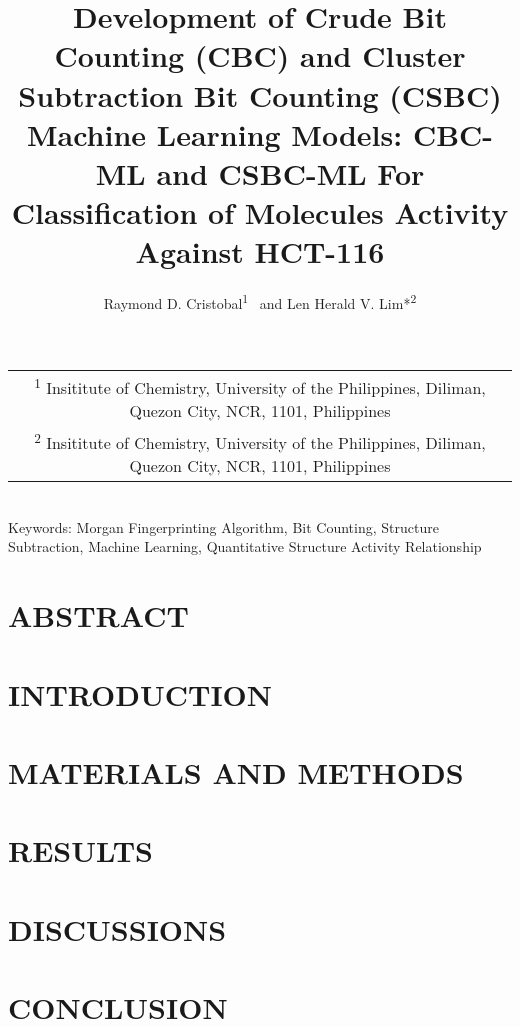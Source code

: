 \documentclass[12pt]{report}
\title{Development of Crude Bit Counting (CBC) and Cluster Subtraction Bit Counting (CSBC) Machine Learning Models: CBC-ML and CSBC-ML For Classification of Molecules Activity Against HCT-116}
\author{Raymond D. Cristobal\textsuperscript{1} \ and Len Herald V. Lim*\textsuperscript{2}}
\makeatletter
\renewcommand{\maketitle}{%
	\begin{center}
		\vspace{-1.5cm} %
		{\normalsize \bfseries \@title \par} %
		\vspace{0.5cm} %
		{\normalsize \@author \par} %
		\vspace{1cm} %
		{\small %
			\begin{tabular}{c} %
				\textsuperscript{1} Insititute of Chemistry, University of the Philippines, Diliman, Quezon City, NCR, 1101, Philippines \\ %
				\textsuperscript{2} Insititute of Chemistry, University of the Philippines, Diliman, Quezon City, NCR, 1101, Philippines %
			\end{tabular}
			\vspace{2cm}
			\\
			{\normalsize Keywords: Morgan Fingerprinting Algorithm, Bit Counting, Structure Subtraction, Machine Learning, Quantitative Structure Activity Relationship}
		}
		\vspace{1cm} %
	\end{center}
}
\makeatother
\begin{document}
	\maketitle
	
	\chapter{ABSTRACT}
	
	
	\chapter{INTRODUCTION}
	
	
	\chapter{MATERIALS AND METHODS}
	
	
	\chapter{RESULTS}
	
	
	\chapter{DISCUSSIONS}
	
		
	\chapter{CONCLUSION}
	
	
%	
	
%	
	
	
	\clearpage
	{\normalsize %
	}
	
\end{document}
